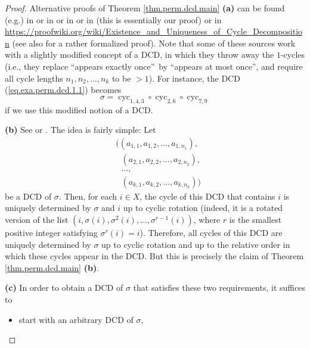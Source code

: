 \begin{proof}
Alternative proofs of Theorem \ref{thm.perm.dcd.main} \textbf{(a)} can be
found (e.g.) in \cite[Theorem 1.5.3]{Goodman} or in \cite[\S I.4, Proposition
1.21]{Knapp16} or in \cite[Chapter I, \S 5.7, Proposition 7]{Bourba74} or in
\cite[\S 1.9, proof of Theorem 1.5.1]{Sagan19} (this is essentially our proof)
or in
\url{https://proofwiki.org/wiki/Existence_and_Uniqueness_of_Cycle_Decomposition}
(see also \cite[Exercise 7 \textbf{(e)} and \textbf{(d)}]{17f-hw7s} for a
rather formalized proof). Note that some of these sources work with a slightly
modified concept of a DCD, in which they throw away the $1$-cycles (i.e., they
replace \textquotedblleft appears exactly once\textquotedblright\ by
\textquotedblleft appears at most once\textquotedblright, and require all
cycle lengths $n_{1},n_{2},\ldots,n_{k}$ to be $>1$). For instance, the DCD
(\ref{eq.exa.perm.dcd.1.1}) becomes%
\[
\sigma=\operatorname*{cyc}\nolimits_{1,4,3}\circ\operatorname*{cyc}%
\nolimits_{2,6}\circ\operatorname*{cyc}\nolimits_{7,9}%
\]
if we use this modified notion of a DCD. \medskip

\textbf{(b)} See \cite[Theorem 1.5.3]{Goodman} or \cite[Chapter I, \S 5.7,
Proposition 7]{Bourba74}. The idea is fairly simple: Let%
\begin{align*}
&  \Big(\left(  a_{1,1},a_{1,2},\ldots,a_{1,n_{1}}\right)  ,\\
&  \ \ \ \left(  a_{2,1},a_{2,2},\ldots,a_{2,n_{2}}\right)  ,\\
&  \ \ \ \ldots,\\
&  \ \ \ \left(  a_{k,1},a_{k,2},\ldots,a_{k,n_{k}}\right)  \Big)
\end{align*}
be a DCD of $\sigma$. Then, for each $i\in X$, the cycle of this DCD that
contains $i$ is uniquely determined by $\sigma$ and $i$ up to cyclic rotation
(indeed, it is a rotated version of the list $\left(  i,\sigma\left(
i\right)  ,\sigma^{2}\left(  i\right)  ,\ldots,\sigma^{r-1}\left(  i\right)
\right)  $, where $r$ is the smallest positive integer satisfying $\sigma
^{r}\left(  i\right)  =i$). Therefore, all cycles of this DCD are uniquely
determined by $\sigma$ up to cyclic rotation and up to the relative order in
which these cycles appear in the DCD. But this is precisely the claim of
Theorem \ref{thm.perm.dcd.main} \textbf{(b)}. \medskip

\textbf{(c)} In order to obtain a DCD of $\sigma$ that satisfies these two
requirements, it suffices to

\begin{itemize}
\item start with an arbitrary DCD of $\sigma$,


\end{itemize}
\end{proof}
